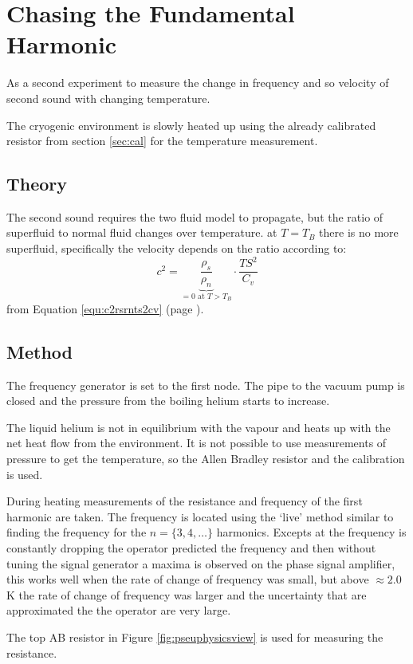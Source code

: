 \section{Chasing the Fundamental Harmonic}
As a second experiment to measure the change in frequency and so velocity
of second sound with changing temperature. 

The cryogenic environment is slowly heated up using the already calibrated 
resistor from section \ref{sec:cal} for the temperature measurement.

\subsection{Theory}
The second sound requires the two fluid model to propagate, but the 
ratio of superfluid to normal fluid changes over temperature.
at $T = T_B$ there is no more superfluid,
specifically the velocity depends on the ratio according to:
$$c^2 = \underbrace{\frac{\rho_s}{\rho_n}}_{ = 0 \text{ at } T>T_B} \cdot \frac{T S^2}{C_v}$$
from Equation \ref{equ:c2rsrnts2cv} (page \pageref{equ:c2rsrnts2cv}).

\subsection{Method}
The frequency generator is set to the first node.
The pipe to the vacuum pump is closed and the pressure from the boiling helium starts to increase.


The liquid helium is not in equilibrium with the vapour and heats up
with the net heat flow from the environment.
It is not possible to use measurements of pressure
to get the temperature, so the Allen Bradley resistor and 
the calibration is used.

During heating measurements of the resistance and frequency of the
first harmonic are taken.
The frequency is located using the `live' method similar to finding the frequency for
the $n= \{3,4,\ldots\}$ harmonics. Excepts at the frequency is constantly dropping
the operator predicted the frequency and then without tuning the signal generator a 
maxima is observed on the phase signal amplifier, this works well when the 
rate of change of frequency was small, but above $\approx2.0$K the rate of 
change of frequency was larger and the uncertainty that are approximated  
the the operator are very large.

The top AB resistor in Figure \ref{fig:pseuphysicsview} is used for measuring the resistance.

